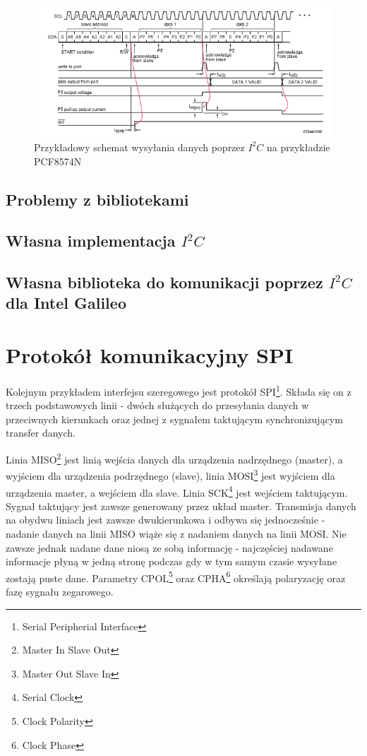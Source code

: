\documentclass{xmgr}
\begin{document}
\begin{figure}[!h]
    \centering
    \includegraphics[height=0.2\textheight]{images/write_i2c.png}
    \caption{Przykładowy schemat wysyłania danych poprzez $I^2C$ na przykładzie PCF8574N\label{$I^2C$}}
\end{figure}
\subsection{Problemy z bibliotekami}
\subsection{Własna implementacja $I^2C$}
\subsection{Własna biblioteka do komunikacji poprzez $I^2C$ dla Intel Galileo}
\section{Protokół komunikacyjny SPI}
Kolejnym przykładem interfejsu szeregowego jest protokół SPI\footnote{Serial Peripherial Interface}. Składa się on z trzech podstawowych linii - dwóch służących do przesyłania danych w przeciwnych kierunkach oraz jednej z sygnałem taktującym synchronizującym transfer danych. 

Linia MISO\footnote{Master In Slave Out} jest linią wejścia danych dla urządzenia nadrzędnego (master), a wyjściem dla urządzenia podrzędnego (slave), linia MOSI\footnote{Master Out Slave In} jest wyjściem dla urządzenia master, a wejściem dla slave. Linia SCK\footnote{Serial Clock} jest wejściem taktującym. Sygnał taktujący jest zawsze generowany przez układ master. Transmisja danych na obydwu liniach jest zawsze dwukierunkowa i odbywa się jednocześnie - nadanie danych na linii MISO wiąże się z nadaniem danych na linii MOSI. Nie zawsze jednak nadane dane niosą ze sobą informację - najczęściej nadawane informacje płyną w jedną stronę podczas gdy w tym samym czasie wysyłane zostają puste dane. Parametry CPOL\footnote{Clock Polarity} oraz CPHA\footnote{Clock Phase} określają polaryzację oraz fazę sygnału zegarowego.
\end{document}
